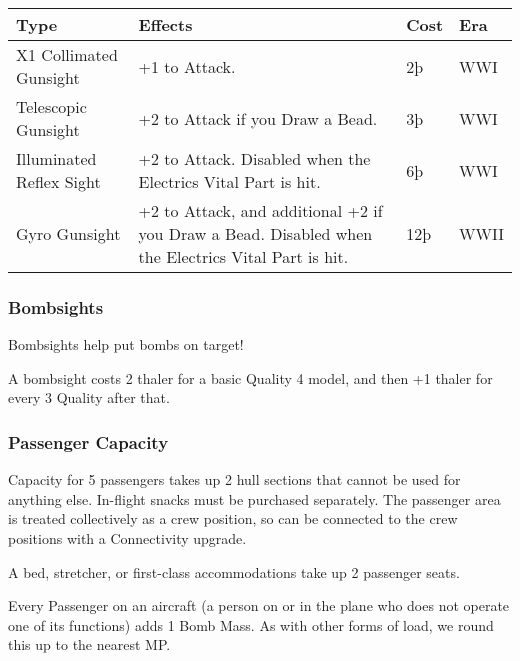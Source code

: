 \documentclass{article}
\begin{document}
\begin{tabular}{|l|l|l|l|}
  \hline
  Type                                                  & Effects                                        & Cost & Era \\\hline
  X1 Collimated Gunsight                                & +1 to Attack.                                  & 2þ   & WWI \\\hline
  Telescopic Gunsight                                   & +2 to Attack if you Draw a Bead.               & 3þ   & WWI \\\hline
  Illuminated Reflex Sight                              & +2 to Attack. Disabled when the Electrics
  Vital Part is hit.                                    & 6þ                                             & WWI        \\\hline
  Gyro Gunsight                                         & {+2 to Attack, and additional +2 if you Draw a
  Bead. Disabled when the Electrics Vital Part is hit.} & {12þ}                                          &
  {WWII}                                                                                                              \\\hline
\end{tabular}

\subsubsection{Bombsights}
\label{_Bombsights}

Bombsights help put bombs on target!

A bombsight costs 2 thaler for a basic Quality 4 model, and then
+1 thaler for every 3 Quality after that.

\subsubsection{Passenger Capacity}
\label{_Passenger_Capacity}

Capacity for 5 passengers takes up 2 hull sections that cannot be used
for anything else. In-flight snacks must be purchased separately. The
passenger area is treated collectively as a crew position, so can be
connected to the crew positions with a Connectivity upgrade.

A bed, stretcher, or first-class accommodations take up 2
passenger seats.

Every Passenger on an aircraft (a person on or in the plane who
does not operate one of its functions) adds 1 Bomb Mass. As with other
forms of load, we round this up to the nearest MP.
\end{document}
